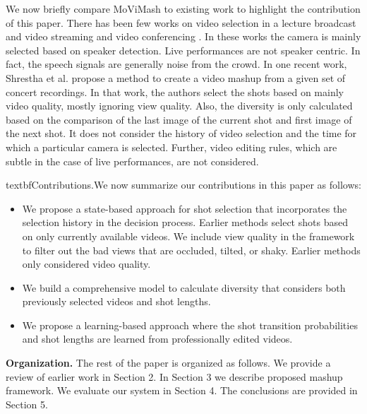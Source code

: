 \documentclass{sig-alternate}
\begin{document}
We now briefly compare MoViMash to existing work to highlight the contribution of this paper. There has been few works on video selection in a lecture broadcast and video streaming \cite{21} \cite{6} and video conferencing \cite{3}. In these works the camera is mainly selected based on speaker detection. Live performances are not speaker centric. In fact, the speech signals are generally noise from the crowd. In one recent work, Shrestha et al. \cite{15} propose a method to create a video mashup from a given set of concert recordings. In that work, the authors select the shots based on mainly video quality, mostly ignoring view quality. Also, the diversity is only calculated based on the comparison of the last image of the current shot and first image of the next shot. It does not consider the history of video selection and the time for which a particular camera is selected. Further, video editing rules, which are subtle in the case of live performances, are not considered.

textbf{Contributions.}We now summarize our contributions in this paper as follows:
\begin{itemize}
\item We propose a state-based approach for shot selection that incorporates the selection history in the decision process. Earlier methods select shots based on only currently available videos. We include view quality in the framework to filter out the bad views that are occluded, tilted, or shaky. Earlier methods only considered video quality.
\item We build a comprehensive model to calculate diversity that considers both previously selected videos and shot lengths.
\item We propose a learning-based approach where the shot transition probabilities and shot lengths are learned from professionally edited videos. 
\end{itemize}
\textbf{Organization.} The rest of the paper is organized as follows.
We provide a review of earlier work in Section 2. In Section 3 we
describe proposed mashup framework. We evaluate our system in
Section 4. The conclusions are provided in Section 5.
\end{document}
